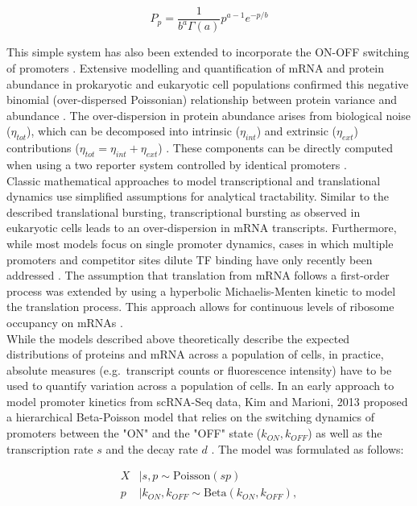 \begin{equation}
P_p=\frac{1}{b^a\Gamma(a)}p^{a-1} e^{-p/b}
\end{equation}

\noindent This simple system has also been extended to incorporate the ON-OFF switching of promoters \citep{Jones2014, Shahrezaei2008}. Extensive modelling and quantification of mRNA and protein abundance in prokaryotic and eukaryotic cell populations confirmed this negative binomial (over-dispersed Poissonian) relationship between protein variance and abundance \citep{Ozbudak2002, Bar-Even2006}. The over-dispersion in protein abundance arises from biological noise ($\eta_{tot}$), which can be decomposed into intrinsic ($\eta_{int}$) and extrinsic ($\eta_{ext}$) contributions ($\eta_{tot}=\eta_{int}+\eta_{ext}$) \citep{Swain2002, Fu2016}. These components can be directly computed when using a two reporter system controlled by identical promoters \citep{Elowitz2002}. \\

Classic mathematical approaches to model transcriptional and translational dynamics use simplified assumptions for analytical tractability. Similar to the described translational bursting, transcriptional bursting as observed in eukaryotic cells \citep{Raj2006} leads to an over-dispersion in mRNA transcripts. Furthermore, while most models focus on single promoter dynamics, cases in which multiple promoters and competitor sites dilute TF binding have only recently been addressed \citep{Das2015a}. The assumption that translation from mRNA follows a first-order process was extended by using a hyperbolic Michaelis-Menten kinetic to model the translation process. This approach allows for continuous levels of ribosome occupancy on mRNAs \citep{VanDyken2017}. \\ 

While the models described above theoretically describe the expected distributions of proteins and mRNA across a population of cells, in practice, absolute measures (e.g.~transcript counts or fluorescence intensity) have to be used to quantify variation across a population of cells. In an early approach to model promoter kinetics from \gls{scRNA-Seq} data, Kim and Marioni, 2013 proposed a hierarchical Beta-Poisson model that relies on the switching dynamics of promoters between the "ON" and the "OFF" state ($k_{ON},k_{OFF}$) as well as the transcription rate $s$ and the decay rate $d$ \citep{Kim2013}. The model was formulated as follows:

\begin{align*}
X&|s,p\sim{}\text{Poisson}(sp)\\
p&|k_{ON},k_{OFF}\sim{}\text{Beta}(k_{ON},k_{OFF}),
\end{align*}

